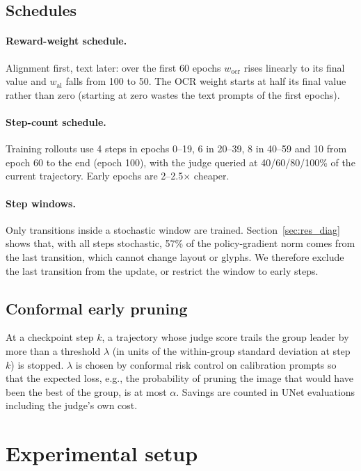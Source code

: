 \documentclass{article}
\begin{document}
\subsection{Schedules}
\label{sec:schedules}
\paragraph{Reward-weight schedule.} Alignment first, text later: over the first 60 epochs $w_{\mathrm{ocr}}$ rises linearly
to its final value and $w_{\mathrm{al}}$ falls from 100 to 50. The OCR weight starts at half its final value rather than zero
(starting at zero wastes the text prompts of the first epochs).
\paragraph{Step-count schedule.} Training rollouts use 4 steps in epochs 0--19, 6 in 20--39, 8 in 40--59 and 10 from epoch 60 to the end (epoch 100), with the judge queried at
40/60/80/100\% of the current trajectory. Early epochs are 2--2.5$\times$ cheaper.
\paragraph{Step windows.} Only transitions inside a stochastic window are trained. Section~\ref{sec:res_diag} shows that, with
all steps stochastic, 57\% of the policy-gradient norm comes from the last transition, which cannot change layout or glyphs.
We therefore exclude the last transition from the update, or restrict the window to early steps.

\subsection{Conformal early pruning}
\label{sec:prune_method}
At a checkpoint step $k$, a trajectory whose judge score trails the group leader by more than a threshold $\lambda$ (in units
of the within-group standard deviation at step $k$) is stopped. $\lambda$ is chosen by conformal risk control
\citep{angelopoulos2024crc} on calibration prompts so that the expected loss, e.g., the probability of pruning the image that
would have been the best of the group, is at most $\alpha$. Savings are counted in UNet evaluations including the judge's
own cost.

\section{Experimental setup}
\label{sec:setup}
\end{document}
